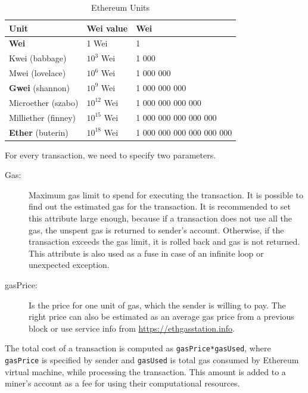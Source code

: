 \documentclass[thesis=M,english]{FITthesis}[2019/12/23]
\begin{document}
\begin{table}[ht!]
\caption{Ethereum Units} \label{EthUnits}
\label{porovnanieDoodleFramadate}
\begin{tabular}{| p{4cm} | p{3cm} | p{5cm} |}
\hline
\textbf{Unit} & \textbf{Wei value} & \textbf{Wei}  \\ \hline
\textbf{Wei}        & 1 Wei     & 1                         \\ \hline
Kwei (babbage)       & \(10^{3}\) Wei    & 1 000                     \\ \hline
Mwei (lovelace)   & \(10^{6}\) Wei    & 1 000 000                 \\ \hline
\textbf{Gwei} (shannon)      & \(10^{9}\) Wei    & 1 000 000 000             \\ \hline
Microether (szabo) & \(10^{12}\) Wei    & 1 000 000 000 000         \\ \hline
Milliether (finney) & \(10^{15}\) Wei    & 1 000 000 000 000 000     \\ \hline
\textbf{Ether} (buterin)      & \(10^{18}\) Wei    & 1 000 000 000 000 000 000 \\ \hline
\end{tabular}
\end{table}


For every transaction, we need to specify two parameters.
\begin{description}
\item[Gas:] Maximum gas limit to spend for executing the transaction. It is possible to find out the estimated gas for the transaction. It is recommended to set this attribute large enough, because if a transaction does not use all the gas, the unspent gas is returned to sender's account. Otherwise, if the transaction exceeds the gas limit, it is rolled back and gas is not returned. This attribute is also used as a fuse in case of an infinite loop or unexpected exception.
\item[gasPrice:] Is the price for one unit of gas, which the sender is willing to pay. The right price can also be estimated as an average gas price from a previous block or use service info from \url{https://ethgasstation.info}.
\end{description}
The total cost of a transaction is computed as \texttt{gasPrice*gasUsed}, where \texttt{gasPrice} is specified by sender and \texttt{gasUsed} is total gas consumed by Ethereum virtual machine, while processing the transaction. This amount is added to a miner's account as a fee for using their computational resources.
\end{document}
